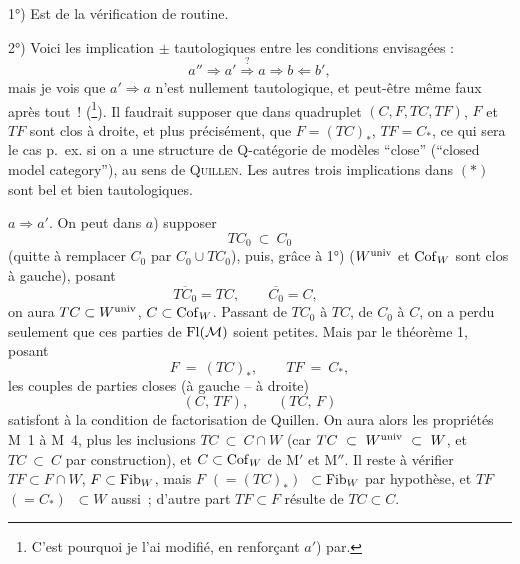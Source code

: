1°) Est de la vérification de routine.

2°) Voici les implication $\pm$ tautologiques entre les conditions envisagées : %
\[ a'' \Longrightarrow a' \overset{?}{\Longrightarrow} a \Longrightarrow b \Longleftarrow b', \tag*{$(*)$} \]
mais je vois que $a' \Longrightarrow a$ n'est nullement tautologique, et peut-être même faux après tout~! (\footnote[13]{C'est pourquoi je l'ai modifié, en renforçant $a'$) par.}). Il faudrait supposer que dans quadruplet $(C,F,TC,TF)$, $F$ et $TF$ sont clos à droite, et plus précisément, que $F = (TC)_*$, $TF = C_*$, ce qui sera le cas p.~ex. si on a une structure de Q-catégorie de modèles “close” (“closed model category”), au sens de \textsc{Quillen}. Les autres trois implications dans $(*)$ sont bel et bien tautologiques.

$a \Longrightarrow a'$. On peut dans $a$) supposer
\[ TC_0 \ \subset\ C_0 \]
(quitte à remplacer $C_0$ par $C_0 \cup TC_0$), puis, grâce à
1°) ($W^{\mathrm{univ}}$ et $\mathrm{Cof}_W$ sont clos à gauche), posant
\[ \overline{TC_0} = TC, \qquad \overline{C_0} = C, \qquad \]
on aura $TC \subset W^{\mathrm{univ}}$, $C \subset \mathrm{Cof}_W$. Passant de $TC_0$ à $TC$, de $C_0$ à $C$, on a perdu seulement que ces parties de $\mathrm{Fl}(\mathcal{M})$ soient petites. Mais par le théorème 1, posant
\[ F \ =\ (TC)_*, \qquad TF \ =\ C_*, \]
les couples de parties closes (à gauche -- à droite)
\[ (C,\, TF), \qquad (TC,\, F) \]
satisfont à la condition de factorisation de Quillen. On aura alors les propriétés M~1 à M~4, plus les inclusions $TC \ \subset\ C \cap W$ (car $TC \ \subset\ W^{\univ} \ \subset\ W$, et $TC \ \subset\ C$ par construction), et $C \subset \mathrm{Cof}_W$ de M$'$ et M$''$. Il reste à vérifier $TF \subset F \cap W$, $F \subset \mathrm{Fib}_W$, mais $F$ $(= (TC)_*)$ $\ \subset \mathrm{Fib}_W$ par hypothèse, et $TF$ $(= C_*)$ $\ \subset W$ aussi~; d'autre part $TF \subset F$ résulte de $TC \subset C$.

